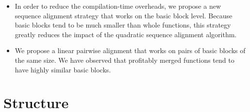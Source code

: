 \begin{itemize}
  \item In order to reduce the compilation-time overheads, we propose a new sequence alignment strategy that works on the basic block level. Because basic blocks tend to be much smaller than whole functions, this strategy greatly reduces the impact of the quadratic sequence alignment algorithm.

  \item We propose a linear pairwise alignment that works on pairs of basic blocks of the same size. We have observed that profitably merged functions tend to have highly similar basic blocks.


\end{itemize}

\section{Structure}


